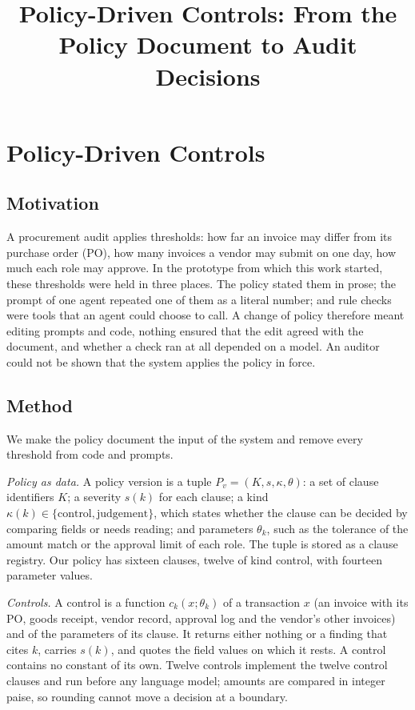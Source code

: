 \documentclass[conference]{IEEEtran}
\begin{document}
\title{Policy-Driven Controls: From the Policy Document to Audit Decisions}
\author{}
\maketitle

\section{Policy-Driven Controls}
\label{sec:policy}

\subsection{Motivation}
A procurement audit applies thresholds: how far an invoice may differ from its purchase order (PO), how many invoices a vendor may submit on one day, how much each role may approve. In the prototype from which this work started, these thresholds were held in three places. The policy stated them in prose; the prompt of one agent repeated one of them as a literal number; and rule checks were tools that an agent could choose to call. A change of policy therefore meant editing prompts and code, nothing ensured that the edit agreed with the document, and whether a check ran at all depended on a model. An auditor could not be shown that the system applies the policy in force.

\subsection{Method}
We make the policy document the input of the system and remove every threshold from code and prompts.

\textit{Policy as data.} A policy version is a tuple $P_v=(K,s,\kappa,\theta)$: a set of clause identifiers $K$; a severity $s(k)$ for each clause; a kind $\kappa(k)\in\{\text{control},\text{judgement}\}$, which states whether the clause can be decided by comparing fields or needs reading; and parameters $\theta_k$, such as the tolerance of the amount match or the approval limit of each role. The tuple is stored as a clause registry. Our policy has sixteen clauses, twelve of kind control, with fourteen parameter values.

\textit{Controls.} A control is a function $c_k(x;\theta_k)$ of a transaction $x$ (an invoice with its PO, goods receipt, vendor record, approval log and the vendor's other invoices) and of the parameters of its clause. It returns either nothing or a finding that cites $k$, carries $s(k)$, and quotes the field values on which it rests. A control contains no constant of its own. Twelve controls implement the twelve control clauses and run before any language model; amounts are compared in integer paise, so rounding cannot move a decision at a boundary.
\end{document}
